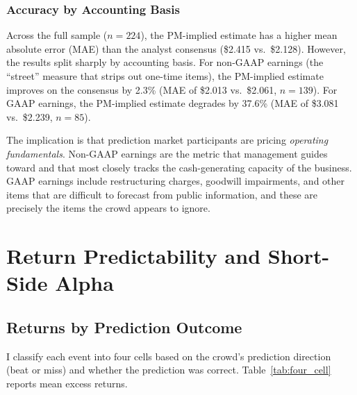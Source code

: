 \documentclass[11pt]{article}
\begin{document}
\subsubsection{Accuracy by Accounting Basis}

Across the full sample ($n = 224$), the PM-implied estimate has a higher mean absolute error (MAE) than the analyst consensus (\$2.415 vs.\ \$2.128). However, the results split sharply by accounting basis. For non-GAAP earnings (the ``street'' measure that strips out one-time items), the PM-implied estimate improves on the consensus by 2.3\% (MAE of \$2.013 vs.\ \$2.061, $n = 139$). For GAAP earnings, the PM-implied estimate degrades by 37.6\% (MAE of \$3.081 vs.\ \$2.239, $n = 85$).

The implication is that prediction market participants are pricing \textit{operating fundamentals}. Non-GAAP earnings are the metric that management guides toward and that most closely tracks the cash-generating capacity of the business. GAAP earnings include restructuring charges, goodwill impairments, and other items that are difficult to forecast from public information, and these are precisely the items the crowd appears to ignore.

\section{Return Predictability and Short-Side Alpha} \label{sec:returns}

\subsection{Returns by Prediction Outcome}

I classify each event into four cells based on the crowd's prediction direction (beat or miss) and whether the prediction was correct. Table~\ref{tab:four_cell} reports mean excess returns.
\end{document}
